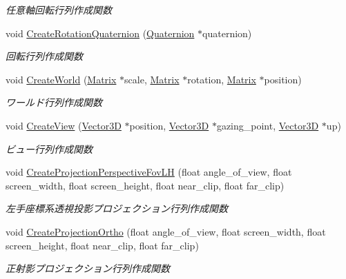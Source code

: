 \begin{DoxyCompactItemize}
\begin{DoxyCompactList}\small\item\em 任意軸回転行列作成関数 \end{DoxyCompactList}\item 
void \mbox{\hyperlink{class_matrix_a5f5948efdd6c0f7c03ba8546f1e9cc4b}{Create\+Rotation\+Quaternion}} (\mbox{\hyperlink{_vector3_d_8h_a3ee38c9c46d9851e33a9a1113328dafc}{Quaternion}} $\ast$quaternion)
\begin{DoxyCompactList}\small\item\em 回転行列作成関数 \end{DoxyCompactList}\item 
void \mbox{\hyperlink{class_matrix_a6609563c41e6da8df1f9153507b24a76}{Create\+World}} (\mbox{\hyperlink{class_matrix}{Matrix}} $\ast$scale, \mbox{\hyperlink{class_matrix}{Matrix}} $\ast$rotation, \mbox{\hyperlink{class_matrix}{Matrix}} $\ast$position)
\begin{DoxyCompactList}\small\item\em ワールド行列作成関数 \end{DoxyCompactList}\item 
void \mbox{\hyperlink{class_matrix_ab0de7031b10ae5993e26627839daf93f}{Create\+View}} (\mbox{\hyperlink{class_vector3_d}{Vector3D}} $\ast$position, \mbox{\hyperlink{class_vector3_d}{Vector3D}} $\ast$gazing\+\_\+point, \mbox{\hyperlink{class_vector3_d}{Vector3D}} $\ast$up)
\begin{DoxyCompactList}\small\item\em ビュー行列作成関数 \end{DoxyCompactList}\item 
void \mbox{\hyperlink{class_matrix_a5c861c39a10a7069acc017ce7d51cfd1}{Create\+Projection\+Perspective\+Fov\+LH}} (float angle\+\_\+of\+\_\+view, float screen\+\_\+width, float screen\+\_\+height, float near\+\_\+clip, float far\+\_\+clip)
\begin{DoxyCompactList}\small\item\em 左手座標系透視投影プロジェクション行列作成関数 \end{DoxyCompactList}\item 
void \mbox{\hyperlink{class_matrix_a8d7f6955eb684d33317130ec2380cfa5}{Create\+Projection\+Ortho}} (float angle\+\_\+of\+\_\+view, float screen\+\_\+width, float screen\+\_\+height, float near\+\_\+clip, float far\+\_\+clip)
\begin{DoxyCompactList}\small\item\em 正射影プロジェクション行列作成関数 \end{DoxyCompactList}\item 

\end{DoxyCompactItemize}
